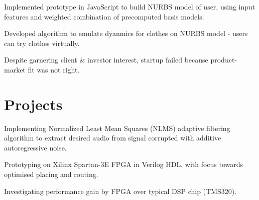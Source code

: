 \documentclass[]{deedy}
\begin{document}
\begin{minipage}[t]{0.69\textwidth}
\begin{flushleft}
\begin{tightemize}
\end{tightemize}
\sectionsep
%
\vspace{1.1pt}
\begin{tightemize}
\item Implemented prototype in JavaScript to build NURBS model of user, using input features and weighted combination of precomputed basis models.
\item Developed algorithm to emulate dyanmics for clothes on NURBS model - users can try clothes virtually.
\item Despite garnering client \& investor interest, startup failed because product-market fit was not right.
\end{tightemize}
\sectionsep
\section{Projects}
%
\vspace{1.1pt}
\begin{tightemize}
\item Implementing Normalized Least Mean Squares (NLMS) adaptive filtering algorithm to extract desired audio from signal corrupted with additive autoregressive noise.
\item Prototyping on Xilinx Spartan-3E FPGA in Verilog HDL, with focus towards optimised placing and routing.
\item Investigating performance gain by FPGA over typical DSP chip (TMS320).
\end{tightemize}
\sectionsep
%
\end{flushleft}
\end{minipage}
\end{document}

